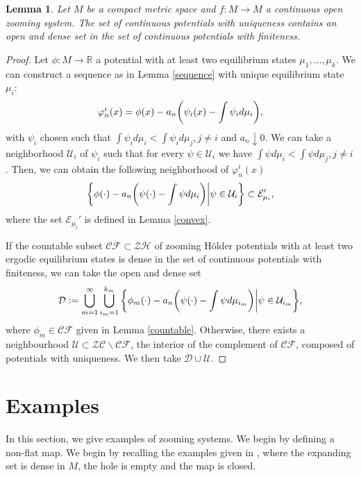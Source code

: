 \documentclass[12pt,a4paper]{amsart}
\theoremstyle{plain}
\newtheorem{lemma}{Lemma}[subsection]
\begin{document}
\begin{lemma}\label{open}
	Let $M$ be a compact metric space and $f: M \to M$ a continuous open zooming system. The set of continuous potentials with uniqueness contains an open and dense set in the set of continuous potentials with finiteness.
\end{lemma} 
\begin{proof}
	Let $\phi: M \to \mathbb{R}$ a potential with at least two equilibrium states $\mu_{1}, \dots, \mu_{k}$. We can construct a sequence as in Lemma \ref{sequence} with unique equilibrium state $\mu_{i}$:
	\[
	\varphi_{n}^{i}(x) = \phi(x) - a_{n}\bigg{(}\psi_{i}(x) - \int \psi_{i} d\mu_{i}\bigg{)},
	\] 
	with $\psi_{i}$ chosen such that $\int\psi_{i} d\mu_{i} < \int \psi_{i} d\mu_{j}, j \neq i$ and $a_{n} \downarrow 0$. We can take a neighborhood $\mathcal{U}_{i}$ of $\psi_{i}$ such that for every $\psi \in \mathcal{U}_{i}$ we have $\int\psi d\mu_{i} < \int \psi d\mu_{j}, j \neq i$. Then, we can obtain the following neighborhood of $\varphi_{n}^{i}(x)$
	\[
	\bigg{\{}\phi(\cdot) - a_{n}\bigg{(}\psi(\cdot) - \int \psi d\mu_{i}\bigg{)} \bigg{|} \psi \in \mathcal{U}_{i}{\bigg\}} \subset \mathcal{E}_{\mu_{i}}',
	\]
	where the set $\mathcal{E}_{\mu_{i}}'$ is defined in Lemma \ref{convex}.
	
	If the countable subset $\mathcal{CF} \subset \mathcal{ZH}$ of zooming H\"older potentials with at least two ergodic equilibrium states is dense in the set of continuous potentials with finiteness, we can take the open and dense set
	\[
	\mathcal{D}:=\bigcup_{m=1}^{\infty}\bigcup_{i_{m}=1}^{k_{m}}\bigg{\{}\phi_{m}(\cdot) - a_{n}\bigg{(}\psi(\cdot) - \int \psi d\mu_{i_{m}}\bigg{)} \bigg{|} \psi \in \mathcal{U}_{i_{m}}{\bigg\}},
	\]
	where $\phi_{m} \in \mathcal{CF}$ given in Lemma \ref{countable}. Otherwise, there exists a neighbourhood $\mathcal{U} \subset \mathcal{ZC} \backslash \mathcal{CF}$, the interior of the complement of $\mathcal{CF}$,  composed of potentials with uniqueness. We then take $\mathcal{D} \cup \mathcal{U}$. 
\end{proof}

\section{Examples}\label{Examples}

In this section, we give examples of  zooming systems. We begin by defining a non-flat map. We begin by recalling the examples given in \cite{AOS}, where the expanding set is dense in $M$, the hole is empty and the map is closed.
\end{document}
